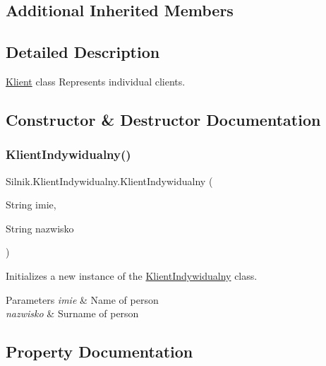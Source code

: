 \subsection*{Additional Inherited Members}


\subsection{Detailed Description}
\mbox{\hyperlink{class_silnik_1_1_klient}{Klient}} class Represents individual clients. 



\subsection{Constructor \& Destructor Documentation}
\mbox{\label{class_silnik_1_1_klient_indywidualny_aad71a96b2d0b01f88f7a4f409f43f28b}} 
\subsubsection{\texorpdfstring{Klient\+Indywidualny()}{KlientIndywidualny()}}
{\footnotesize\ttfamily Silnik.\+Klient\+Indywidualny.\+Klient\+Indywidualny (\begin{DoxyParamCaption}\item[{String}]{imie,  }\item[{String}]{nazwisko }\end{DoxyParamCaption})}



Initializes a new instance of the \mbox{\hyperlink{class_silnik_1_1_klient_indywidualny}{Klient\+Indywidualny}} class. 


\begin{DoxyParams}{Parameters}
{\em imie} & Name of person\\
\hline
{\em nazwisko} & Surname of person\\
\hline
\end{DoxyParams}


\subsection{Property Documentation}
\mbox{\label{class_silnik_1_1_klient_indywidualny_a91475465ea4c5df8a30690dd5d7cee94}} 
